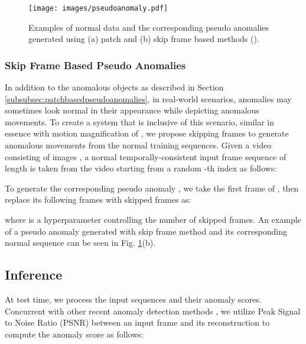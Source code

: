 \documentclass{bmvc2k}
\begin{document}
\begin{figure}
\begin{center}
\texttt{[image: images/pseudoanomaly.pdf]}
\vspace{-10mm}
\end{center}
   \caption{Examples of normal data and the corresponding pseudo anomalies generated using (a) patch and (b) skip frame based methods ().}
\label{fig:pseudoanomaly}
\vspace{-4mm}
\end{figure}





\vspace{-2mm}
\subsubsection{Skip Frame Based Pseudo Anomalies}
\label{subsubsec:skipframebasedpseudoanomalies}

In addition to the anomalous objects as described in Section \ref{subsubsec:patchbasedpseudoanomalies}, in real-world scenarios, anomalies may sometimes look normal in their appearance while depicting anomalous movements.
To create a system that is inclusive of this scenario, similar in essence with motion magnification of \cite{georgescu2021background}, we propose skipping frames to generate anomalous movements from the normal training sequences. Given a video consisting of  images , a normal temporally-consistent input frame sequence  of length  is taken from the video starting from a random -th index as follows:

To generate the corresponding pseudo anomaly , we take the first frame of , then replace its following frames with skipped frames  as: 

where  is a hyperparameter controlling the number of skipped frames. 
An example of a pseudo anomaly generated with skip frame method and its corresponding normal sequence can be seen in Fig. \ref{fig:pseudoanomaly}(b).


\vspace{-2mm}
\subsection{Inference}
At test time, we process the input sequences and their anomaly scores. Concurrent with other recent anomaly detection methods \cite{park2020learning,liu2018future,dong2020dual}, we utilize Peak Signal to Noise Ratio (PSNR)  between an input frame and its reconstruction to compute the anomaly score as follows:
\end{document}
